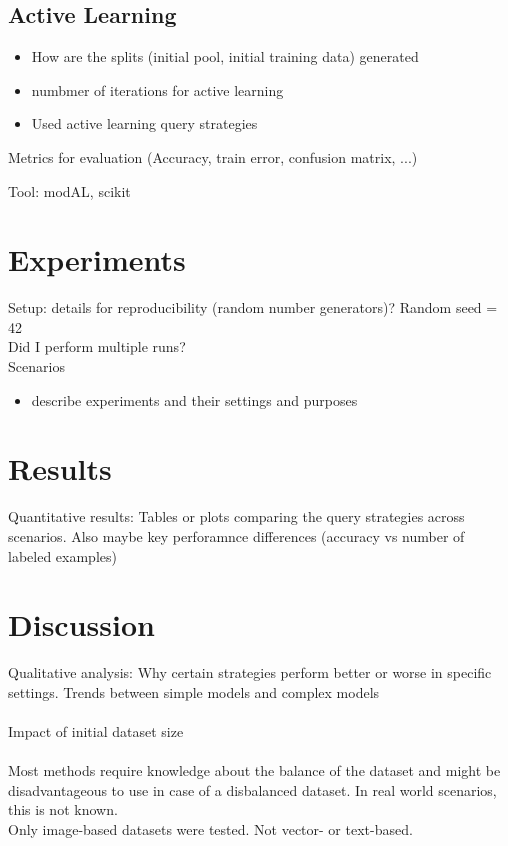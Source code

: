 \documentclass{article}
\theoremstyle{plain}
\theoremstyle{definition}
\theoremstyle{remark}
\begin{document}
\subsection{Active Learning}
\begin{itemize}
	\item How are the splits (initial pool, initial training data) generated
	\item numbmer of iterations for active learning
	\item Used active learning query strategies
\end{itemize}

Metrics for evaluation (Accuracy, train error, confusion matrix, ...)

Tool: modAL, scikit

\section{Experiments}\label{sec:experiments}
Setup: details for reproducibility (random number generators)?
Random seed = 42
\\
Did I perform multiple runs?
\\

Scenarios
\begin{itemize}
	\item describe experiments and their settings and purposes
\end{itemize}

\section{Results}\label{sec:results}
Quantitative results: Tables or plots comparing the query strategies across scenarios. Also maybe key perforamnce differences (accuracy vs number of labeled examples)

\section{Discussion}\label{sec:discussion}
Qualitative analysis: Why certain strategies perform better or worse in specific settings. Trends between simple models and complex models
\\
\\
Impact of initial dataset size
\\
\\
Most methods require knowledge about the balance of the dataset and might be disadvantageous to use in case of a disbalanced dataset. In real world scenarios, this is not known. \\
Only image-based datasets were tested. Not vector- or text-based. 
\end{document}
